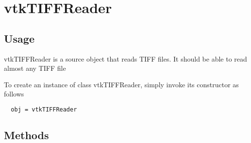 \section{vtkTIFFReader}

\subsection{Usage}

 vtkTIFFReader is a source object that reads TIFF files.
 It should be able to read almost any TIFF file


To create an instance of class vtkTIFFReader, simply
invoke its constructor as follows
\begin{verbatim}
  obj = vtkTIFFReader
\end{verbatim}
\subsection{Methods}

